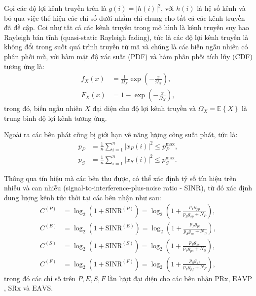 \documentclass[../main.tex]{subfiles}
\begin{document}
Gọi các độ lợi kênh truyền trên là $g(i) = \left|h(i)\right|^2$, với $h(i)$ là hệ số kênh và bỏ qua việc thể hiện các chỉ số dưới nhằm chỉ chung cho tất cả các kênh truyền đã đề cập. Coi như tất cả các kênh truyền trong mô hình là kênh truyền suy hao Rayleigh bán tĩnh (quasi-static Rayleigh fading), tức là các độ lợi kênh truyền là không đổi trong suốt quá trình truyền từ mã và chúng là các biến ngẫu nhiên có phân phối mũ, với hàm mật độ xác suất (PDF) và hàm phân phối tích lũy (CDF) tương ứng là:
\begin{subequations}\label{channel}
\begin{align}
    f_X(x) &= \frac{1}{\Omega_X}\exp\left(-\frac{x}{\Omega_X}\right), \label{pdfc} \\
    F_X(x) &= 1-\exp\left(-\frac{x}{\Omega_X}\right), \label{cdfc}
\end{align}
\end{subequations}
trong đó, biến ngẫu nhiên $X$ đại diện cho độ lợi kênh truyền và $\Omega_X = \mathbb{E}\left\{X\right\}$ là trung bình độ lợi kênh tương ứng.

Ngoài ra các bên phát cũng bị giới hạn về năng lượng công suất phát, tức là:
\begin{subequations}\label{power}
\begin{align}
    p_P &= \frac{1}{n}\sum_{i=1}^{n}\left|x_P(i)\right|^2 \leq p_P^\text{max}, \label{pp} \\
    p_S &= \frac{1}{n}\sum_{i=1}^{n}\left|x_S(i)\right|^2 \leq p_S^\text{max}. \label{ps}
\end{align}
\end{subequations}

Thông qua tín hiệu mà các bên thu được, có thể xác định tỷ số tín hiệu trên nhiễu và can nhiễu (signal-to-interference-plus-noise ratio - SINR), từ đó xác định dung lượng kênh tức thời tại các bên nhận như sau:
\begin{subequations}\label{capacity}
\begin{align}
    C^{(P)} &= \log_2\left(1 + \text{SINR}^{(P)}\right) = \log_2\left(1 + \frac{p_Pg_{pp}}{p_Sg_{sp} + N_P}\right), \label{cp} \\
    C^{(E)} &= \log_2\left(1 + \text{SINR}^{(E)}\right) = \log_2\left(1 + \frac{p_Pg_{pe}}{p_Sg_{se} + N_E}\right), \label{ce} \\
    C^{(S)} &= \log_2\left(1 + \text{SINR}^{(S)}\right) = \log_2\left(1 + \frac{p_Sg_{ss}}{p_Pg_{ps} + N_S}\right), \label{cs} \\
    C^{(F)} &= \log_2\left(1 + \text{SINR}^{(F)}\right) = \log_2\left(1 + \frac{p_Sg_{sf}}{p_Pg_{pf} + N_F}\right), \label{cf}
\end{align}
\end{subequations}
trong đó các chỉ số trên $P, E, S, F$ lần lượt đại diện cho các bên nhận $\text{PRx}$, $\text{EAVP}$, $\text{SRx}$ và $\text{EAVS}$.
\end{document}
